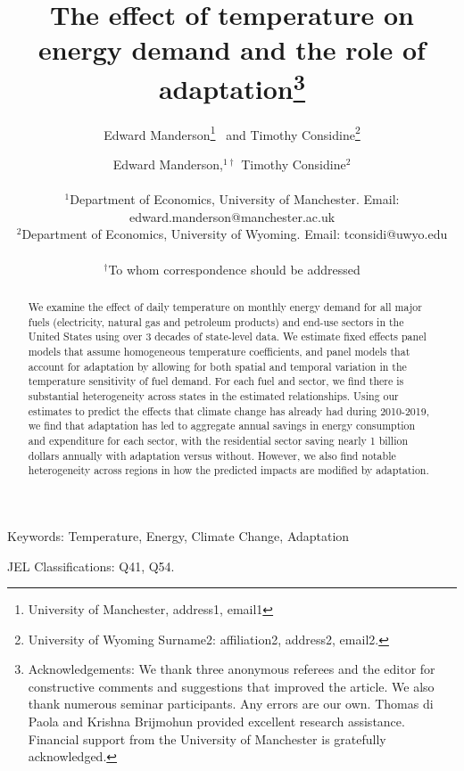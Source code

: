 \documentclass[11pt]{article}
\title{The effect of temperature on energy demand and the role of adaptation\thanks{Acknowledgements: We thank three anonymous referees and the editor for constructive comments and suggestions that improved the article. We also thank numerous seminar participants. Any errors are our own. Thomas di Paola and Krishna Brijmohun provided excellent research assistance. Financial support from the University of Manchester is gratefully acknowledged.}}
\author{Edward Manderson\thanks{University of Manchester, address1, email1} \ and Timothy Considine\thanks{University of Wyoming
		Surname2: affiliation2, address2,
		email2.}}
\author
{Edward Manderson,$^{1\dagger}$ Timothy Considine$^{2}$\\
\\
\normalsize{$^{1}$Department of Economics, University of Manchester. Email: edward.manderson@manchester.ac.uk}\\
\normalsize{$^{2}$Department of Economics, University of Wyoming. Email: tconsidi@uwyo.edu}\\
\\
\normalsize{$^\dagger$To whom correspondence should be addressed}
}
\begin{document}
 


\baselineskip24pt


\maketitle 
\thispagestyle{empty}



\begin{abstract}
We examine the effect of daily temperature on monthly energy demand for all major fuels (electricity, natural gas and petroleum products) and end-use sectors in the United States using over 3 decades of state-level data. We estimate fixed effects panel models that assume homogeneous temperature coefficients, and panel models that account for adaptation by allowing for both spatial and temporal variation in the temperature sensitivity of fuel demand. For each fuel and sector, we find there is substantial heterogeneity across states in the estimated relationships. Using our estimates to predict the effects that climate change has already had during 2010-2019, we find that adaptation has led to aggregate annual savings in energy consumption and expenditure for each sector, with the residential sector saving nearly 1 billion dollars annually with adaptation versus without. However, we also find notable heterogeneity across regions in how the predicted impacts are modified by adaptation. %
    
\end{abstract}


Keywords: Temperature, Energy, Climate Change, Adaptation  

JEL Classifications: Q41, Q54.

\bigskip\newpage

\end{document}

